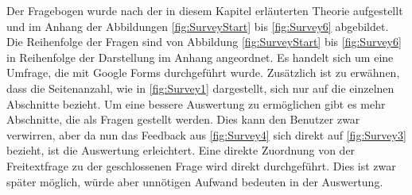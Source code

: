 Der Fragebogen wurde nach der in diesem Kapitel erläuterten Theorie aufgestellt und im Anhang der Abbildungen \vref{fig:SurveyStart} bis \vref{fig:Survey6} abgebildet.
Die Reihenfolge der Fragen sind von Abbildung \ref{fig:SurveyStart} bis \ref{fig:Survey6} in Reihenfolge der Darstellung im Anhang angeordnet.
Es handelt sich um eine Umfrage, die mit Google Forms durchgeführt wurde.
Zusätzlich ist zu erwähnen, dass die Seitenanzahl, wie in \vref{fig:Survey1} dargestellt, sich nur auf die einzelnen Abschnitte bezieht.
Um eine bessere Auswertung zu ermöglichen gibt es mehr Abschnitte, die als Fragen gestellt werden. Dies kann den Benutzer zwar verwirren, aber da nun das Feedback aus \vref{fig:Survey4} sich direkt auf \vref{fig:Survey3} bezieht, ist die Auswertung erleichtert.    
Eine direkte Zuordnung von der Freitextfrage zu der geschlossenen Frage wird direkt durchgeführt. 
Dies ist zwar später möglich, würde aber unnötigen Aufwand bedeuten in der Auswertung.
